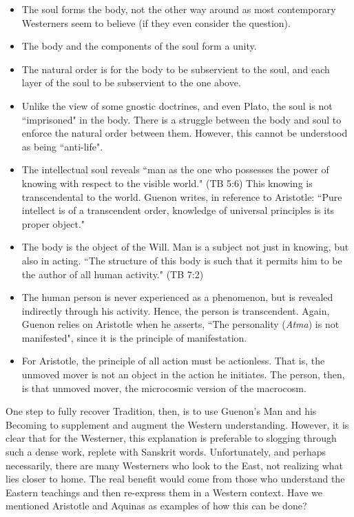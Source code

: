 \begin{itemize}
\item The soul forms the body, not the other way around as most contemporary Westerners seem to believe (if they even consider the question). 
\item The body and the components of the soul form a unity. 
\item The natural order is for the body to be subservient to the soul, and each layer of the soul to be subservient to the one above. 
\item Unlike the view of some gnostic doctrines, and even Plato, the soul is not ``imprisoned" in the body. There is a struggle between the body and soul to enforce the natural order between them. However, this cannot be understood as being ``anti-life". 
\item The intellectual soul reveals ``man as the one who possesses the power of knowing with respect to the visible world." (TB 5:6) This knowing is transcendental to the world. Guenon writes, in reference to Aristotle: ``Pure intellect is of a transcendent order, knowledge of universal principles is its proper object." 
\item The body is the object of the Will. Man is a subject not just in knowing, but also in acting. ``The structure of this body is such that it permits him to be the author of all human activity." (TB 7:2) 
\item The human person is never experienced as a phenomenon, but is revealed indirectly through his activity. Hence, the person is transcendent. Again, Guenon relies on Aristotle when he asserts, ``The personality (\emph{Atma}) is not manifested", since it is the principle of manifestation. 
\item For Aristotle, the principle of all action must be actionless. That is, the unmoved mover is not an object in the action he initiates. The person, then, is that unmoved mover, the microcosmic version of the macrocosm. 
\end{itemize}


One step to fully recover Tradition, then, is to use Guenon's Man and his Becoming to supplement and augment the Western understanding. However, it is clear that for the Westerner, this explanation is preferable to slogging through such a dense work, replete with Sanskrit words. Unfortunately, and perhaps necessarily, there are many Westerners who look to the East, not realizing what lies closer to home. The real benefit would come from those who understand the Eastern teachings and then re-express them in a Western context. Have we mentioned Aristotle and Aquinas as examples of how this can be done?

